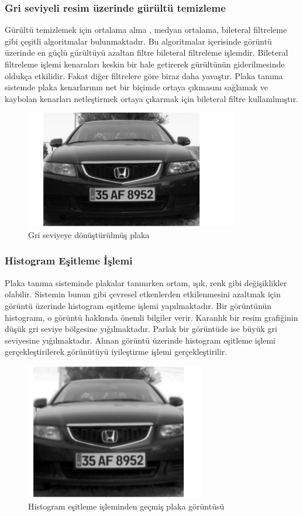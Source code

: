 \subsubsection{Gri seviyeli resim üzerinde gürültü temizleme}
\cite{shape} Gürültü temizlemek için ortalama alma , medyan ortalama, bileteral filtreleme gibi çeşitli algoritmalar bulunmaktadır. Bu algoritmalar içerisinde görüntü üzerinde en güçlü gürültüyü azaltan filtre bileteral filtreleme işlemdir. Bileteral filtreleme işlemi kenaraları keskin bir hale getirerek gürültünün giderilmesinde oldukça etkilidir. Fakat diğer filtrelere göre biraz daha yavaştır. Plaka tanıma sistemde plaka kenarlarının net bir biçimde ortaya çıkmasını sağlamak ve kaybolan kenarları netleştirmek ortaya çıkarmak için bileteral filtre 
kullanılmıştır.
\begin{figure}
    \centering
    \includegraphics{gri seviye plaka.PNG}
    \caption{Gri seviyeye dönüştürülmüş plaka}
    \label{fig:my_label}
\end{figure}
\subsubsection{Histogram Eşitleme İşlemi}
\cite{platereg}
Plaka tanıma sisteminde plakalar tanınırken ortam, ışık, renk gibi değişiklikler olabilir. Sistemin bunun gibi çevresel etkenlerden etkilenmesini azaltmak için görüntü üzerinde histogram eşitleme işlemi yapılmaktadır. Bir görüntünün histogramı, o görüntü hakkında önemli bilgiler verir. Karanlık bir resim grafiğinin düşük gri seviye bölgesine yığılmaktadır. Parlak bir görüntüde ise büyük gri seviyesine yığılmaktadır. Alınan görüntü üzerinde histogram eşitleme işlemi gerçekleştirilerek görünütüyü iyileştirme işlemi gerçekleştirilir.

\begin{figure}
    \centering
    \includegraphics{histogram filtre.PNG}
    \caption{Histogram eşitleme işleminden geçmiş plaka görüntüsü}
    \label{fig:my_label}
\end{figure}

